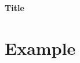 \documentclass{article}
\begin{document}
\begin{minipage}[H]{\textwidth}
\vspace{0.3cm}
		\begin{center}
		
		\vspace{0.3cm}
			\Huge{\textbf{Title}}\\
			
			
		
			
		\vspace{0.3cm}	
		
		\vspace{0.7cm}	
			

			
		\end{center}
	\end{minipage}

	\section{Example}
	
	    
	
\end{document}
